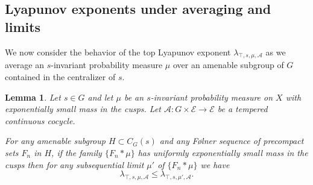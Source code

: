 \documentclass[10pt,reqno]{amsart}
\theoremstyle{Theorem}
\newtheorem{lemma}[theorem]{Lemma}
\theoremstyle{definition}
\theoremstyle{remark}
\renewcommand{\epsilon}{\varepsilon}
\def\calA{\mathcal A}
\def\calE{\mathcal E}
\def\Folner{F{\o}lner }
\begin{document}

\subsection{Lyapunov exponents under averaging and limits}
We now consider the behavior of the top Lyapunov exponent $\lambda_{\top, s, \mu, \calA}$ as we average an $s$-invariant probability measure $\mu$ over an amenable subgroup of $G$ contained in the centralizer of $s$.
\begin{lemma}
\label{lemma:averaging}
Let $s\in G$ and let $\mu$ be an $s$-invariant probability measure on $X$ with exponentially small mass in the cusps.  Let $\calA\colon G\times \calE\to \calE$ be a tempered continuous cocycle.

For any amenable subgroup $H\subset C_G(s)$ and any   \Folner sequence of precompact sets $F_n$ in $H$,  if the family
$\{F_n \ast \mu\}$ has uniformly exponentially small mass in the cusps  then for any subsequential limit
$\mu'$ of $\{F_n \ast \mu\}$ we have
  $$\lambda_{\top, s, \mu, \calA} \le \lambda_{\top, s, \mu', \calA}.$$
\end{lemma}
\end{document}
